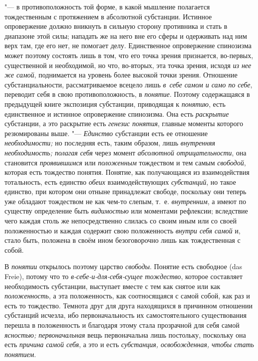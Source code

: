 "--- в противоположность той форме, в какой мышление полагается
тождественным с протяжением в абсолютной субстанции. Истинное опровержение
должно вникнуть в сильную сторону противника и стать в
диапазоне этой силы; нападать же на него вне его сферы и одерживать над ним
верх там, где его нет, не помогает делу. Единственное опровержение
спинозизма может поэтому состоять лишь в том, что его точка зрения
признается, во-первых, существенной и необходимой, но что, во-вторых, эта
точка зрения, исходя {\em из нее же самой}, поднимается на уровень более
высокой точки зрения. Отношение субстанциальности, рассматриваемое всецело
лишь {\em в~себе самом и само по себе}, переводит себя в свою
противоположность, в {\em понятие}. Поэтому содержащаяся в предыдущей книге
экспозиция субстанции, приводящая к {\em понятию}, есть единственное и
истинное опровержение спинозизма. Она есть {\em раскрытие} субстанции, а это
раскрытие есть {\em генезис понятия}, главные моменты которого резюмированы
выше. "--- {\em Единство} субстанции есть ее отношение {\em необходимости;}
но последняя есть, таким образом, лишь {\em внутренняя необходимость;
полагая себя} через момент {\em абсолютной отрицательности}, она
становится {\em проявившимся} или {\em положенным} тождеством и тем самым
{\em свободой}, которая есть тождество понятия. Понятие, как получающаяся из
взаимодействия тотальность, есть единство {\em обеих} взаимодействующих
{\em субстанций}, но такое единство, при котором они отныне принадлежат
свободе, поскольку они теперь уже обладают тождеством не как чем-то слепым,
т.~е. {\em внутренним}, а имеют по существу определение быть {\em видимостью}
или моментами рефлексии; вследствие чего каждая столь же непосредственно
слилась со своим иным или со своей положенностью и каждая содержит свою
положенность {\em внутри себя самой} и, стало быть, положена в своём ином
безоговорочно лишь как тождественная с собой.

В {\em понятии} открылось поэтому царство {\em свободы}. Понятие есть
свободное (das Freie), потому что то {\em в-себе-и-для-себя-сущее тождество},
которое составляет необходимость субстанции, выступает вместе с тем как
снятое или как {\em положенность}, а эта положенность, как соотносящаяся с
самой собой, как раз и есть то тождество. Темнота друг для друга находящихся
в причинном отношении субстанций исчезла, ибо первоначальность их
самостоятельного существования перешла в положенность и благодаря этому
стала прозрачной для себя самой {\em ясностью; первоначальная}
вещь
первоначальна лишь постольку, поскольку она есть {\em причина самой себя},
а это и есть {\em субстанция, освобожденная, чтобы стать понятием}.

